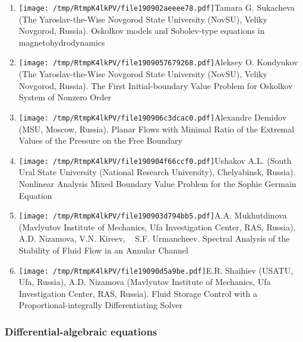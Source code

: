 \documentclass[
]{article}
\providecommand{\tightlist}{%
  \setlength{\itemsep}{0pt}\setlength{\parskip}{0pt}}
\begin{document}
\begin{enumerate}
\def\labelenumi{\arabic{enumi}.}
\tightlist
\item
  \protect\texttt{[image: /tmp/RtmpK4lkPV/file190902aeeee78.pdf]}Tamara
  G. Sukacheva (The Yaroslav-the-Wise Novgorod State University (NovSU),
  Veliky Novgorod, Russia). Oskolkov models and Sobolev-type equations
  in magnetohydrodynamics
\item
  \protect\texttt{[image: /tmp/RtmpK4lkPV/file1909057679268.pdf]}Aleksey
  O. Kondyukov (The Yaroslav-the-Wise Novgorod State University (NovSU),
  Veliky Novgorod, Russia). The First Initial-boundary Value Problem for
  Oskolkov System of Nonzero Order
\item
  \protect\texttt{[image: /tmp/RtmpK4lkPV/file190906c3dcac0.pdf]}Alexandre
  Demidov (MSU, Moscow, Russia). Planar Flows with Minimal Ratio of the
  Extremal Values of the Pressure on the Free Boundary
\item
  \protect\texttt{[image: /tmp/RtmpK4lkPV/file190904f66ccf0.pdf]}Ushakov
  A.L. (South Ural State University (National Research University),
  Chelyabinsk, Russia). Nonlinear Analysis Mixed Boundary Value Problem
  for the Sophie Germain Equation
\item
  \protect\texttt{[image: /tmp/RtmpK4lkPV/file190903d794bb5.pdf]}A.A.
  Mukhutdinova (Mavlyutov Institute of Mechanics, Ufa Investigation
  Center, RAS, Russia), A.D. Nizamova, V.N. Kireev, ~ S.F. Urmancheev.
  Spectral Analysis of the Stability of Fluid Flow in an Annular Channel
\item
  \protect\texttt{[image: /tmp/RtmpK4lkPV/file19090d5a9be.pdf]}E.R.
  Shaihiev (USATU, Ufa, Russia), A.D. Nizamova (Mavlyutov Institute of
  Mechanics, Ufa Investigation Center, RAS, Russia). Fluid Storage
  Control with a Proportional-integrally Differentiating Solver
\end{enumerate}

\hypertarget{dae}{%
\subsubsection{Differential-algebraic equations}\label{dae}}
\end{document}

